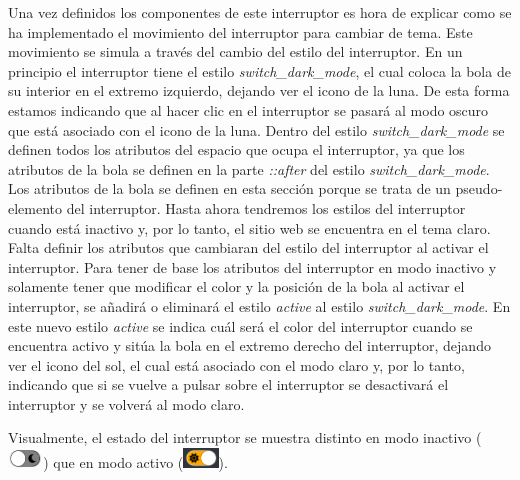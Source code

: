Una vez definidos los componentes de este interruptor es hora de explicar como se ha implementado el movimiento del interruptor para cambiar de tema. Este movimiento se simula a través del cambio del estilo del interruptor. En un principio el interruptor tiene el estilo \textit{switch\_dark\_mode}, el cual coloca la bola de su interior en el extremo izquierdo, dejando ver el icono de la luna. De esta forma estamos indicando que al hacer clic en el interruptor se pasará al modo oscuro que está asociado con el icono de la luna. Dentro del estilo \textit{switch\_dark\_mode} se definen todos los atributos del espacio que ocupa el interruptor, ya que los atributos de la bola se definen en la parte \textit{::after} del estilo \textit{switch\_dark\_mode}. Los atributos de la bola se definen en esta sección porque se trata de un pseudo-elemento del interruptor. Hasta ahora tendremos los estilos del interruptor cuando está inactivo y, por lo tanto, el sitio web se encuentra en el tema claro. Falta definir los atributos que cambiaran del estilo del interruptor al activar el interruptor. Para tener de base los atributos del interruptor en modo inactivo y solamente tener que modificar el color y la posición de la bola al activar el interruptor, se añadirá o eliminará el estilo \textit{active} al estilo \textit{switch\_dark\_mode}. En este nuevo estilo \textit{active} se indica cuál será el color del interruptor cuando se encuentra activo y sitúa la bola en el extremo derecho del interruptor, dejando ver el icono del sol, el cual está asociado con el modo claro y, por lo tanto, indicando que si se vuelve a pulsar sobre el interruptor se desactivará el interruptor y se volverá al modo claro.

Visualmente, el estado del interruptor se muestra distinto en modo inactivo (\includegraphics[width=0.07\textwidth]{imagenes/07_Implementacion/switch_inactive.png}) que en modo activo (\includegraphics[width=0.07\textwidth]{imagenes/07_Implementacion/switch_active.png}).


